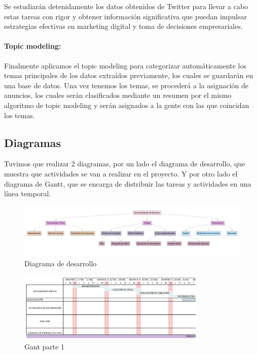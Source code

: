 \documentclass[
  letterpaper,
  DIV=11,
  numbers=noendperiod]{scrartcl}
\let\oldparagraph\paragraph
\renewcommand{\paragraph}[1]{\oldparagraph{#1}\mbox{}}
\begin{document}
Se estudiarán detenidamente los datos obtenidos de Twitter para llevar a
cabo estas tareas con rigor y obtener información significativa que
puedan impulsar estrategias efectivas en marketing digital y toma de
decisiones empresariales.

\paragraph{Topic modeling:}\label{topic-modeling}

Finalmente aplicamos el topic modeling para categorizar automáticamente
los temas principales de los datos extraídos previamente, los cuales se
guardarán en una base de datos. Una vez tenemos los temas, se procederá
a la asignación de anuncios, los cuales serán clasificados mediante un
resumen por el mismo algoritmo de topic modeling y serán asignados a la
gente con las que coincidan los temas.

\newpage{}

\subsection{Diagramas}\label{diagramas}

Tuvimos que realizar 2 diagramas, por un lado el diagrama de desarrollo,
que muestra que actividades se van a realizar en el proyecto. Y por otro
lado el diagrama de Gantt, que se encarga de distribuir las tareas y
actividades en una línea temporal.

\begin{figure}[H]

{\centering \includegraphics{diagrama de desarrollo.png}

}

\caption{Diagrama de desarrollo}

\end{figure}%

\begin{figure}[htbp]
    \centering
    \includegraphics[width=0.8\textwidth, height=0.4\textheight]{gant1.png}
    \caption{Gant parte 1}
    \label{fig:gant1}
\end{figure}
\end{document}
